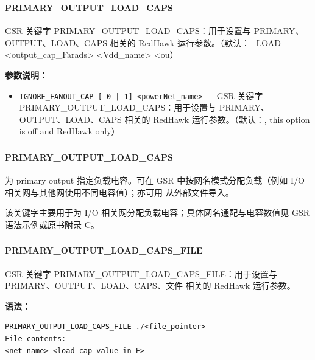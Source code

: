 \subsubsection{}
\paragraph*{PRIMARY_OUTPUT_LOAD_CAPS}

GSR 关键字 PRIMARY_OUTPUT_LOAD_CAPS：用于设置与 PRIMARY、OUTPUT、LOAD、CAPS 相关的 RedHawk 运行参数。（默认：_LOAD <output_cap_Farads> <Vdd_name> <ou）

\textbf{参数说明：}
\begin{itemize}
\item \texttt{IGNORE\_FANOUT\_CAP [ 0 | 1] <powerNet\_name>} — GSR 关键字 PRIMARY\_OUTPUT\_LOAD\_CAPS：用于设置与 PRIMARY、OUTPUT、LOAD、CAPS 相关的 RedHawk 运行参数。（默认：, this option is off and RedHawk only）
\end{itemize}

\subsubsection{}
\paragraph*{PRIMARY_OUTPUT_LOAD_CAPS}

为 primary output 指定负载电容。可在 GSR 中按网名模式分配负载（例如 I/O 相关网与其他网使用不同电容值）；亦可用  从外部文件导入。

\begin{noteBox}
该关键字主要用于为 I/O 相关网分配负载电容；具体网名通配与电容数值见 GSR 语法示例或原书附录 C。
\end{noteBox}

\subsubsection{}
\paragraph*{PRIMARY_OUTPUT_LOAD_CAPS_FILE}

GSR 关键字 PRIMARY_OUTPUT_LOAD_CAPS_FILE：用于设置与 PRIMARY、OUTPUT、LOAD、CAPS、文件 相关的 RedHawk 运行参数。

\textbf{语法：}
\begin{lstlisting}
PRIMARY_OUTPUT_LOAD_CAPS_FILE ./<file_pointer>
File contents:
<net_name> <load_cap_value_in_F>
\end{lstlisting}

